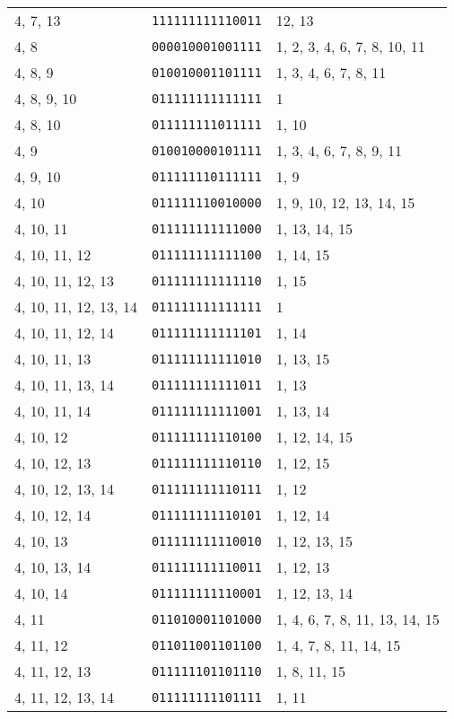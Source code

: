 \documentclass[a4paper,12pt]{article}
\begin{document}
\begin{longtable}{l|l|l}
        4, 7, 13&\texttt{111111111110011}&12, 13\\
        4, 8&\texttt{000010001001111}&1, 2, 3, 4, 6, 7, 8, 10, 11\\
        4, 8, 9&\texttt{010010001101111}&1, 3, 4, 6, 7, 8, 11\\
        4, 8, 9, 10&\texttt{011111111111111}&1\\
        4, 8, 10&\texttt{011111111011111}&1, 10\\
        4, 9&\texttt{010010000101111}&1, 3, 4, 6, 7, 8, 9, 11\\
        4, 9, 10&\texttt{011111110111111}&1, 9\\
        4, 10&\texttt{011111110010000}&1, 9, 10, 12, 13, 14, 15\\
        4, 10, 11&\texttt{011111111111000}&1, 13, 14, 15\\
        4, 10, 11, 12&\texttt{011111111111100}&1, 14, 15\\
        4, 10, 11, 12, 13&\texttt{011111111111110}&1, 15\\
        4, 10, 11, 12, 13, 14&\texttt{011111111111111}&1\\
        4, 10, 11, 12, 14&\texttt{011111111111101}&1, 14\\
        4, 10, 11, 13&\texttt{011111111111010}&1, 13, 15\\
        4, 10, 11, 13, 14&\texttt{011111111111011}&1, 13\\
        4, 10, 11, 14&\texttt{011111111111001}&1, 13, 14\\
        4, 10, 12&\texttt{011111111110100}&1, 12, 14, 15\\
        4, 10, 12, 13&\texttt{011111111110110}&1, 12, 15\\
        4, 10, 12, 13, 14&\texttt{011111111110111}&1, 12\\
        4, 10, 12, 14&\texttt{011111111110101}&1, 12, 14\\
        4, 10, 13&\texttt{011111111110010}&1, 12, 13, 15\\
        4, 10, 13, 14&\texttt{011111111110011}&1, 12, 13\\
        4, 10, 14&\texttt{011111111110001}&1, 12, 13, 14\\
        4, 11&\texttt{011010001101000}&1, 4, 6, 7, 8, 11, 13, 14, 15\\
        4, 11, 12&\texttt{011011001101100}&1, 4, 7, 8, 11, 14, 15\\
        4, 11, 12, 13&\texttt{011111101101110}&1, 8, 11, 15\\
        4, 11, 12, 13, 14&\texttt{011111111101111}&1, 11\\

\end{longtable}
\end{document}
